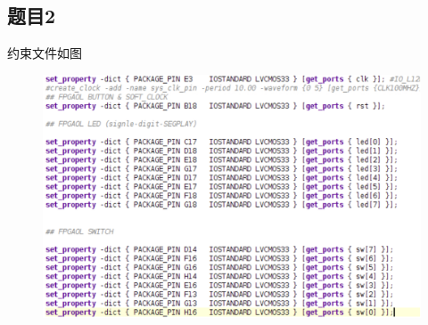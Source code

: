 \documentclass{article}
\begin{document}
    \subsection*{题目2} 
    约束文件如图
    \begin{figure}[htbp]
        \centering
        \includegraphics[scale=0.8]{x2.png}
    \end{figure}

    \vspace*{2cm}
\end{document}
